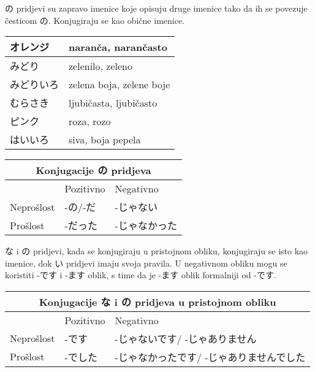 
 の pridjevi su zapravo imenice koje opisuju druge imenice tako da ih se povezuje česticom の. Konjugiraju se kao obične imenice.
 
 	\vspace{10pt}
	\begin{tabular}{|l|l|}
		\hline
		オレンジ&naranča, narančasto\\\hline
		みどり&zelenilo, zeleno\\\hline
		みどりいろ&zelena boja, zelene boje\\\hline
		むらさき&ljubičasta, ljubičasto\\\hline
		ピンク&roza, rozo\\\hline
		はいいろ&siva, boja pepela\\\hline
	\end{tabular}
	
	\vspace{10pt}
	\begin{tabular}{|l||l|l|}
		\hline
		\multicolumn{3}{c}{Konjugacije の pridjeva}\\\hline
		 &Pozitivno&Negativno\\\hline
		Neprošlost&-の/-だ&-じゃない\\\hline
		Prošlost&-だった&-じゃなかった\\\hline
	\end{tabular}
	
	\begin{reibun}
	\end{reibun}
	


な i の pridjevi, kada se konjugiraju u pristojnom obliku, konjugiraju se isto kao imenice, dok い pridjevi imaju svoja pravila. U negativnom obliku mogu se koristiti -です i -ます oblik, s time da je -ます oblik formalniji od -です.

	\vspace{10pt}
	\begin{tabular}{|l||l|l|}
		\hline
		\multicolumn{3}{c}{Konjugacije な i の pridjeva u pristojnom obliku}\\\hline
		 &Pozitivno&Negativno\\\hline
		Neprošlost&-です&-じゃないです/ -じゃありません\\\hline
		Prošlost&-でした&-じゃなかったです/ -じゃありませんでした\\\hline
	\end{tabular}
	
